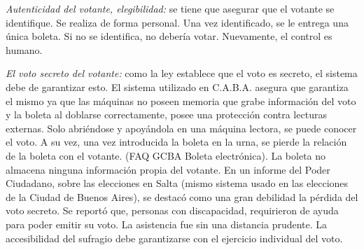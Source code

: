 \textit{Autenticidad del votante, elegibilidad:} se tiene que asegurar que el votante se identifique. Se realiza de forma personal. Una vez identificado, se le entrega una única boleta. Si no se identifica, no debería votar. Nuevamente, el control es humano.

\textit{El voto secreto del votante:} como la ley establece que el voto es secreto, el sistema debe de garantizar esto. El sistema utilizado en C.A.B.A. asegura que garantiza el mismo ya que las máquinas no poseen memoria que grabe información del voto y la boleta al doblarse correctamente, posee una protección contra lecturas externas. Solo abriéndose y apoyándola en una máquina lectora, se puede conocer el voto. A su vez, una vez introducida la boleta en la urna, se pierde la relación de la boleta con el votante. (FAQ GCBA Boleta electrónica). La boleta no almacena ninguna información propia del votante.
En un informe del Poder Ciudadano, sobre las elecciones en Salta (mismo sistema usado en las elecciones de la Ciudad de Buenos Aires), se destacó como una gran debilidad la pérdida del voto secreto. Se reportó que, personas con discapacidad, requirieron de ayuda para poder emitir su voto. La asistencia fue sin una distancia prudente. La accesibilidad del sufragio debe garantizarse con el ejercicio individual del voto.

